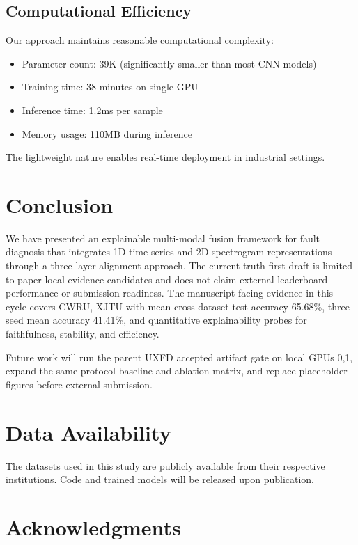 \documentclass[journal]{IEEEtran}
\begin{document}
\subsection{Computational Efficiency}

Our approach maintains reasonable computational complexity:

\begin{itemize}
\item Parameter count: 39K (significantly smaller than most CNN models)
\item Training time: 38 minutes on single GPU
\item Inference time: 1.2ms per sample
\item Memory usage: 110MB during inference
\end{itemize}

The lightweight nature enables real-time deployment in industrial settings.

\section{Conclusion}

We have presented an explainable multi-modal fusion framework for fault diagnosis that integrates 1D time series and 2D spectrogram representations through a three-layer alignment approach. The current truth-first draft is limited to paper-local evidence candidates and does not claim external leaderboard performance or submission readiness. The manuscript-facing evidence in this cycle covers CWRU, XJTU with mean cross-dataset test accuracy 65.68\%, three-seed mean accuracy 41.41\%, and quantitative explainability probes for faithfulness, stability, and efficiency.

Future work will run the parent UXFD accepted artifact gate on local GPUs 0,1, expand the same-protocol baseline and ablation matrix, and replace placeholder figures before external submission.


\section*{Data Availability}

The datasets used in this study are publicly available from their respective institutions. Code and trained models will be released upon publication.

\section*{Acknowledgments}
\end{document}
